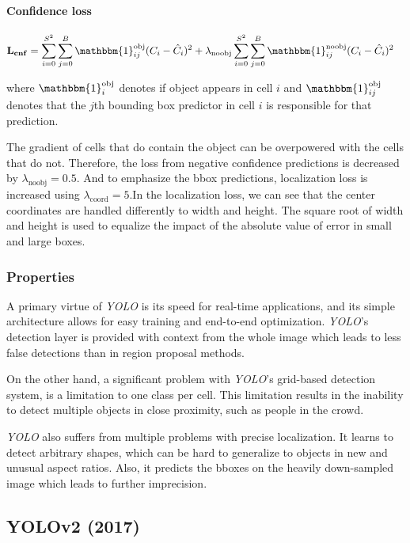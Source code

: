 \paragraph{Confidence loss}
\begin{align*}
\mathbf{L_{cnf}} &= \sum_{i=0}^{S^2} \sum_{j=0}^B \mathbbm{1}_{ij}^{\text{obj}} (C_i - \hat{C}_i)^2 
+ \lambda_{\text{noobj}} \sum_{i=0}^{S^2} \sum_{j=0}^B \mathbbm{1}_{ij}^{\text{noobj}} (C_i - \hat{C}_i)^2
\end{align*}

\noindent where $\mathbbm{1}^{\text{obj}}_i$ denotes if object appears in cell $i$ and $\mathbbm{1}^{\text{obj}}_{ij}$ denotes that the $j$th bounding box predictor in cell $i$ is responsible for that prediction.

The gradient of cells that do contain the object can be overpowered with the cells that do not.  Therefore, the loss from negative confidence predictions is decreased by $\lambda_{\text{noobj}} = 0.5$. And to emphasize the bbox predictions, localization loss is increased using $\lambda_{\text{coord}} = 5$.In the localization loss, we can see that the center coordinates are handled differently to width and height. The square root of width and height is used to equalize the impact of the absolute value of error in small and large boxes.


\subsubsection{Properties}
A primary virtue of \textit{YOLO} is its speed for real-time applications, and its simple architecture allows for easy training and end-to-end optimization. \textit{YOLO}'s detection layer is provided with context from the whole image which leads to less false detections than in region proposal methods. 

On the other hand, a significant problem with \textit{YOLO}'s grid-based detection system, is a limitation to one class per cell. This limitation results in the inability to detect multiple objects in close proximity, such as people in the crowd. 

\textit{YOLO} also suffers from multiple problems with precise localization. It learns to detect arbitrary shapes, which can be hard to generalize to objects in new and unusual aspect ratios. Also, it predicts the bboxes on the heavily down-sampled image which leads to further imprecision. 

\subsection{YOLOv2 (2017)}
\citeauthor{bib:yolo9000} \cite{bib:yolo9000}


